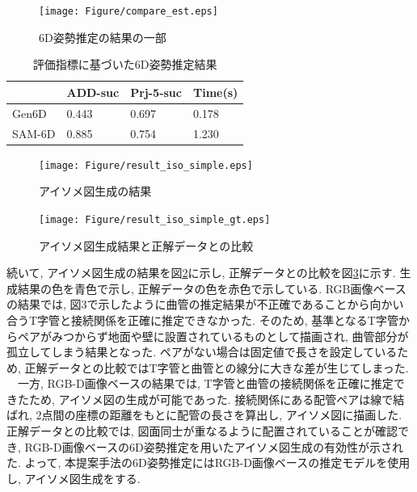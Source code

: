 \begin{figure}[htbt]
	\centering
	\texttt{[image: Figure/compare\_est.eps]}
	\caption{6D姿勢推定の結果の一部}
	\label{fig:4-f7}
\end{figure}

\begin{table}[h]
	\centering
	\caption{評価指標に基づいた6D姿勢推定結果}
	\begin{tabular}{|p{1.7cm}|p{1.7cm}|p{1.7cm}|p{1.7cm}|}
	\hline
	& ADD-suc & Prj-5-suc & Time(s) \\
	\hline
	Gen6D & 0.443 & 0.697 & 0.178 \\
	\hline
	SAM-6D & 0.885 & 0.754 & 1.230 \\
	\hline
	\end{tabular}
\end{table}


\begin{figure}[htbt]
	\centering
	\texttt{[image: Figure/result\_iso\_simple.eps]}
	\caption{アイソメ図生成の結果}
	\label{fig:4-f8}
\end{figure}
\begin{figure}[htbt]
	\centering
	\texttt{[image: Figure/result\_iso\_simple\_gt.eps]}
	\caption{アイソメ図生成結果と正解データとの比較}
	\label{fig:4-f9}
\end{figure}
続いて, アイソメ図生成の結果を図\ref{fig:4-f8}に示し, 正解データとの比較を図\ref{fig:4-f9}に示す. 
生成結果の色を青色で示し, 正解データの色を赤色で示している. 
RGB画像ベースの結果では, 図3で示したように曲管の推定結果が不正確であることから向かい合うT字管と接続関係を正確に推定できなかった. 
そのため, 基準となるT字管からペアがみつからず地面や壁に設置されているものとして描画され, 曲管部分が孤立してしまう結果となった. 
ペアがない場合は固定値で長さを設定しているため, 正解データとの比較ではT字管と曲管との線分に大きな差が生じてしまった. \\
　一方, RGB-D画像ベースの結果では, T字管と曲管の接続関係を正確に推定できたため, アイソメ図の生成が可能であった. 
接続関係にある配管ペアは線で結ばれ, 2点間の座標の距離をもとに配管の長さを算出し, アイソメ図に描画した. 
正解データとの比較では, 図面同士が重なるように配置されていることが確認でき, RGB-D画像ベースの6D姿勢推定を用いたアイソメ図生成の有効性が示された. 
よって, 本提案手法の6D姿勢推定にはRGB-D画像ベースの推定モデルを使用し, アイソメ図生成をする. 
